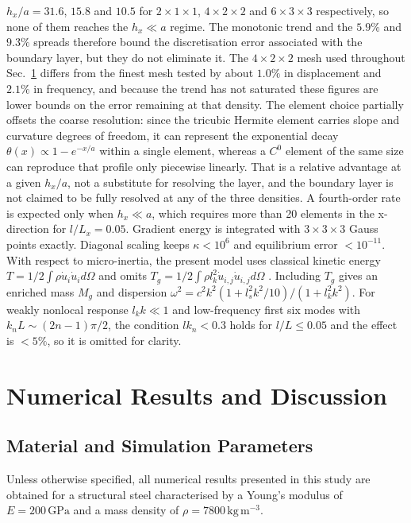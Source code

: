 \documentclass[final,3p,times,fleqn]{elsarticle}
\begin{document}
$h_{x}/a=31.6$, $15.8$ and $10.5$ for $2\times1\times1$, $4\times2\times2$
and $6\times3\times3$ respectively, so none of them reaches the
$h_{x}\ll a$ regime. The monotonic trend and the $5.9\%$ and $9.3\%$
spreads therefore bound the discretisation error associated with the
boundary layer, but they do not eliminate it. The $4\times2\times2$ mesh
used throughout Sec.~\ref{sec:numerical_results} differs from the finest
mesh tested by about $1.0\%$ in displacement and $2.1\%$ in frequency,
and because the trend has not saturated these figures are lower bounds on
the error remaining at that density. The element choice partially offsets
the coarse resolution: since the tricubic Hermite element carries slope
and curvature degrees of freedom, it can represent the exponential decay
$\theta(x)\propto1-e^{-x/a}$ within a single element, whereas a $C^{0}$
element of the same size can reproduce that profile only piecewise
linearly. That is a relative advantage at a given $h_{x}/a$, not a
substitute for resolving the layer, and the boundary layer is not claimed
to be fully resolved at any of the three densities. A fourth-order rate is expected only when $h_x \ll a$, which requires more than 20 elements in the x-direction for $l/L_x=0.05$. Gradient energy is integrated with $3\times3\times3$ Gauss points exactly. Diagonal scaling keeps $\kappa<10^6$ and equilibrium error $<10^{-11}$. With respect to micro-inertia, the present model uses classical kinetic energy $T=1/2\int\rho\dot{u}_i\dot{u}_i d\Omega$ and omits $T_g=1/2\int\rho l_k^2\dot{u}_{i,j}\dot{u}_{i,j}d\Omega$ \cite{Mindlin1964}. Including $T_g$ gives an enriched mass $M_g$ and dispersion $\omega^2=c^2k^2(1+l_s^2k^2/10)/(1+l_k^2k^2)$. For weakly nonlocal response $l_kk\ll1$ and low-frequency first six modes with $k_nL\sim(2n-1)\pi/2$, the condition $lk_n<0.3$ holds for $l/L\le0.05$ and the effect is $<5\%$, so it is omitted for clarity.


\section{Numerical Results and Discussion}
\label{sec:numerical_results}


\subsection{Material and Simulation Parameters}
\label{sec:materials}

Unless otherwise specified, all numerical results presented in this
study are obtained for a structural steel characterised by a Young's
modulus of $E = 200\,\mathrm{GPa}$ and a mass density of
$\rho = 7800\,\mathrm{kg\,m^{-3}}$.
\end{document}

